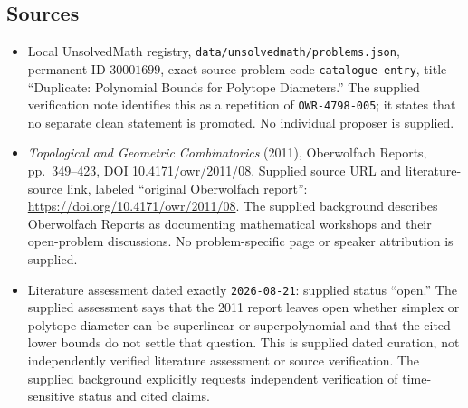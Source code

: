 \documentclass[11pt]{article}
\begin{document}
\subsection{Sources}
\begin{itemize}
\item Local UnsolvedMath registry, \texttt{data/unsolvedmath/problems.json}, permanent ID \(30001699\), exact source problem code \texttt{catalogue entry}, title ``Duplicate: Polynomial Bounds for Polytope Diameters.'' The supplied verification note identifies this as a repetition of \texttt{OWR-4798-005}; it states that no separate clean statement is promoted. No individual proposer is supplied.
\item \emph{Topological and Geometric Combinatorics} (2011), Oberwolfach Reports, pp.\ 349--423, DOI 10.4171/owr/2011/08. Supplied source URL and literature-source link, labeled ``original Oberwolfach report'': \url{https://doi.org/10.4171/owr/2011/08}. The supplied background describes Oberwolfach Reports as documenting mathematical workshops and their open-problem discussions. No problem-specific page or speaker attribution is supplied.
\item Literature assessment dated exactly \texttt{2026-08-21}: supplied status ``open.'' The supplied assessment says that the 2011 report leaves open whether simplex or polytope diameter can be superlinear or superpolynomial and that the cited lower bounds do not settle that question. This is supplied dated curation, not independently verified literature assessment or source verification. The supplied background explicitly requests independent verification of time-sensitive status and cited claims.
\end{itemize}
\end{document}
